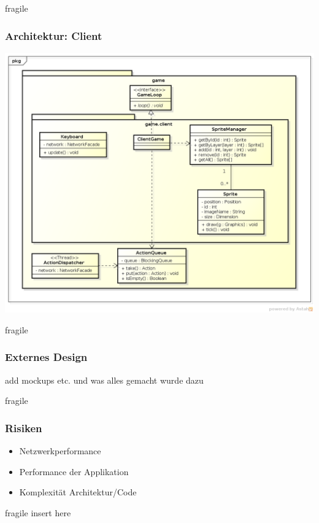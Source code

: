 \documentclass[10pt, compress]{beamer}
\begin{document}
\begin{frame}{fragile}
	\frametitle{Architektur: Client}
	\begin{center}
	\includegraphics[scale=0.3]{ClassDiagramGameClient}
	\end{center}
\end{frame}

\begin{frame}{fragile}
	\frametitle{Externes Design}
	add mockups etc. und was alles gemacht wurde dazu
\end{frame}

\begin{frame}{fragile}
	\frametitle{Risiken}
	\begin{itemize}
	\item Netzwerkperformance
	\item Performance der Applikation
	\item Komplexität Architektur/Code
	\end{itemize}
\end{frame}


\begin{frame}{fragile}
    insert here
\end{frame}



\end{document}

